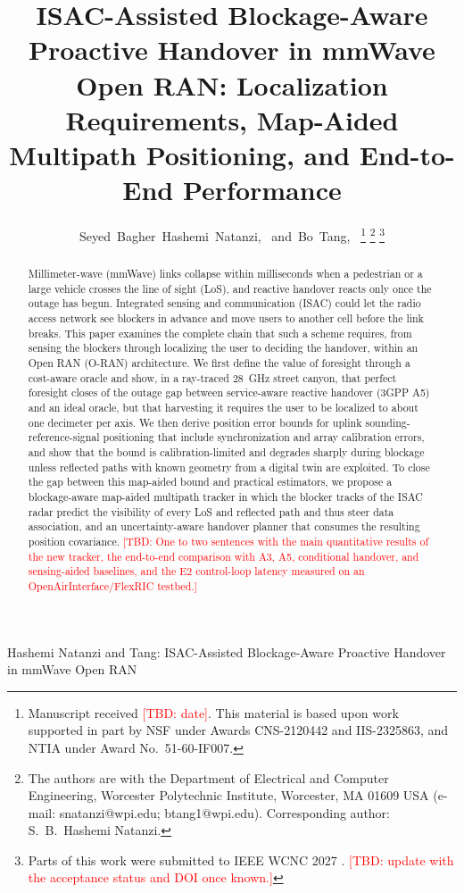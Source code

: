 \documentclass[journal]{IEEEtran}
\newcommand{\tbd}[1]{\textcolor{red}{[TBD: #1]}}
\begin{document}
\title{ISAC-Assisted Blockage-Aware Proactive Handover in mmWave Open RAN:
Localization Requirements, Map-Aided Multipath Positioning, and
End-to-End Performance}

\author{Seyed~Bagher~Hashemi~Natanzi,~
and~Bo~Tang,~%
\thanks{Manuscript received \tbd{date}. This material is based upon work
supported in part by NSF under Awards CNS-2120442 and IIS-2325863, and
NTIA under Award No.\ 51-60-IF007.}%
\thanks{The authors are with the Department of Electrical and Computer
Engineering, Worcester Polytechnic Institute, Worcester, MA 01609 USA
(e-mail: snatanzi@wpi.edu; btang1@wpi.edu). Corresponding author:
S.~B.~Hashemi Natanzi.}%
\thanks{Parts of this work were submitted to IEEE WCNC 2027
\cite{natanzi2027wcncA,natanzi2027wcncB}. \tbd{update with the
acceptance status and DOI once known.}}}

%
{Hashemi Natanzi and Tang: ISAC-Assisted Blockage-Aware Proactive Handover in mmWave Open RAN}

\maketitle

\begin{abstract}
Millimeter-wave (mmWave) links collapse within milliseconds when a
pedestrian or a large vehicle crosses the line of sight (LoS), and
reactive handover reacts only once the outage has begun. Integrated
sensing and communication (ISAC) could let the radio access network see
blockers in advance and move users to another cell before the link
breaks. This paper examines the complete chain that such a scheme
requires, from sensing the blockers through localizing the user to
deciding the handover, within an Open RAN (O-RAN) architecture. We first
define the value of foresight through a cost-aware oracle and show, in a
ray-traced \SI{28}{GHz} street canyon, that perfect foresight closes
\numValueRange{} of the outage gap between service-aware reactive
handover (3GPP A5) and an ideal oracle, but that harvesting it requires
the user to be localized to about one decimeter per axis. We then derive
position error bounds for uplink sounding-reference-signal positioning
that include synchronization and array calibration errors, and show that
the bound is calibration-limited and degrades sharply during blockage
unless reflected paths with known geometry from a digital twin are
exploited. \textcolor{propcol}{To close the gap between this map-aided
bound and practical estimators, we propose a blockage-aware map-aided
multipath tracker in which the blocker tracks of the ISAC radar predict
the visibility of every LoS and reflected path and thus steer data
association, and an uncertainty-aware handover planner that consumes the
resulting position covariance.} \tbd{One to two sentences with the main
quantitative results of the new tracker, the end-to-end comparison with
A3, A5, conditional handover, and sensing-aided baselines, and the E2
control-loop latency measured on an OpenAirInterface/FlexRIC testbed.}
\end{abstract}
\end{document}
